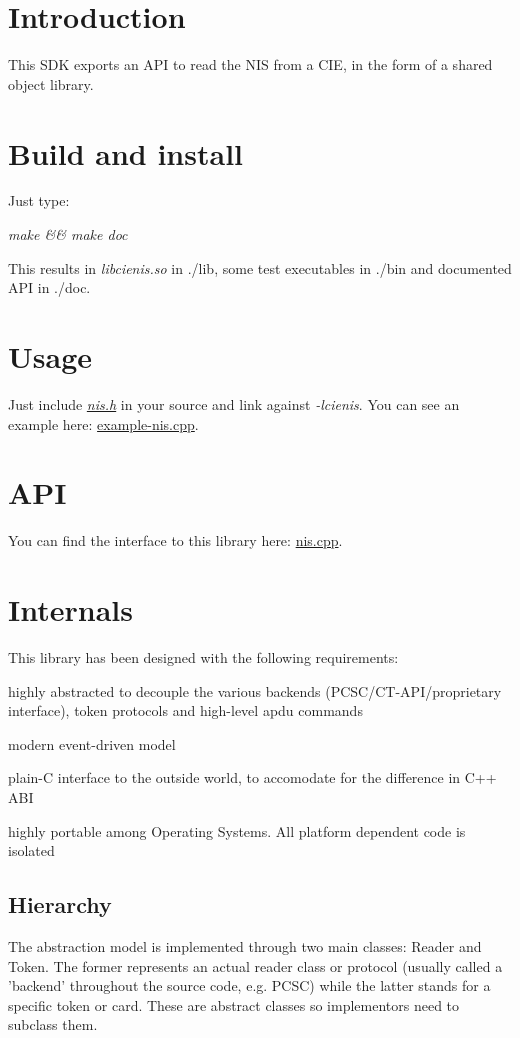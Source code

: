 \hypertarget{index_sec-intro}{}\section{Introduction}\label{index_sec-intro}
This S\-D\-K exports an A\-P\-I to read the N\-I\-S from a C\-I\-E, in the form of a shared object library.\hypertarget{index_sec-build-install}{}\section{Build and install}\label{index_sec-build-install}
Just type\-:

{\itshape make \&\& make doc}

This results in {\itshape libcienis.\-so} in {\itshape }./lib, some test executables in {\itshape }./bin and documented A\-P\-I in ./doc.\hypertarget{index_sec-usage}{}\section{Usage}\label{index_sec-usage}
Just include {\itshape \hyperlink{nis_8h_source}{nis.\-h}} in your source and link against {\itshape -\/lcienis}. You can see an example here\-: \hyperlink{example-nis_8cpp}{example-\/nis.\-cpp}.\hypertarget{index_sec-api}{}\section{A\-P\-I}\label{index_sec-api}
You can find the interface to this library here\-: \hyperlink{nis_8cpp}{nis.\-cpp}.\hypertarget{index_sec-internals}{}\section{Internals}\label{index_sec-internals}
This library has been designed with the following requirements\-:
\begin{DoxyItemize}
\item highly abstracted to decouple the various backends (P\-C\-S\-C/\-C\-T-\/\-A\-P\-I/proprietary interface), token protocols and high-\/level apdu commands
\item modern event-\/driven model
\item plain-\/\-C interface to the outside world, to accomodate for the difference in C++ A\-B\-I
\item highly portable among Operating Systems. All platform dependent code is isolated
\end{DoxyItemize}\hypertarget{index_subsec-hierarchy}{}\subsection{Hierarchy}\label{index_subsec-hierarchy}
The abstraction model is implemented through two main classes\-: Reader and Token. The former represents an actual reader class or protocol (usually called a 'backend' throughout the source code, e.\-g. P\-C\-S\-C) while the latter stands for a specific token or card. These are abstract classes so implementors need to subclass them.

